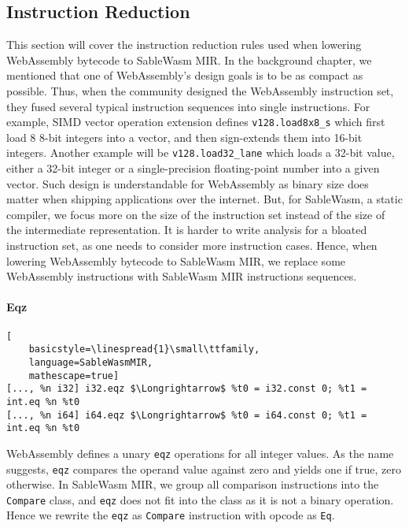 \subsection{Instruction Reduction}

This section will cover the instruction reduction rules used when lowering
WebAssembly bytecode to SableWasm MIR. In the background chapter, we mentioned
that one of WebAssembly's design goals is to be as compact as possible. Thus,
when the community designed the WebAssembly instruction set, they fused several
typical instruction sequences into single instructions. For example, SIMD vector
operation extension defines \texttt{v128.load8x8\_s} which first load 8
8-bit integers into a vector, and then sign-extends them into 16-bit
integers. Another example will be \texttt{v128.load32\_lane} which loads a
32-bit value, either a 32-bit integer or a single-precision floating-point
number into a given vector. Such design is understandable for WebAssembly as
binary size does matter when shipping applications over the internet. But, for
SableWasm, a static compiler, we focus more on the size of the instruction set
instead of the size of the intermediate representation. It is harder to write
analysis for a bloated instruction set, as one needs to consider more
instruction cases. Hence, when lowering WebAssembly bytecode to SableWasm MIR,
we replace some WebAssembly instructions with SableWasm MIR instructions
sequences.

\paragraph{Eqz} \quad
\begin{lstlisting}[
    basicstyle=\linespread{1}\small\ttfamily, 
    language=SableWasmMIR, 
    mathescape=true]
[..., %n i32] i32.eqz $\Longrightarrow$ %t0 = i32.const 0; %t1 = int.eq %n %t0
[..., %n i64] i64.eqz $\Longrightarrow$ %t0 = i64.const 0; %t1 = int.eq %n %t0
\end{lstlisting}
WebAssembly defines a unary \texttt{eqz} operations for all integer values. As
the name suggests, \texttt{eqz} compares the operand value against zero and
yields one if true, zero otherwise. In SableWasm MIR, we group all comparison
instructions into the \texttt{Compare} class, and \texttt{eqz} does not fit into
the class as it is not a binary operation. Hence we rewrite the \texttt{eqz} as
\texttt{Compare} instruction with opcode as \texttt{Eq}.


